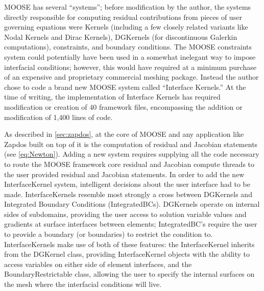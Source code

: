 MOOSE has several ``systems''; before modification by the author, the systems directly responsible for computing residual contributions from pieces of user governing equations were Kernels (including a few closely related variants like Nodal Kernels and Dirac Kernels), DGKernels (for discontinuous Galerkin computations), constraints, and boundary conditions. The MOOSE constraints system could potentially have been used in a somewhat inelegant way to impose interfacial conditions; however, this would have required at a minimum purchase of an expensive and proprietary commercial meshing package. Instead the author chose to code a brand new MOOSE system called ``Interface Kernels.'' At the time of writing, the implementation of Interface Kernels has required modification or creation of 40 framework files, encompassing the addition or modification of 1,400 lines of code.

As described in \cref{sec:zapdos}, at the core of MOOSE and any application like Zapdos built on top of it is the computation of residual and Jacobian statements (see \cref{eq:Newton}). Adding a new system requires supplying all the code necessary to route the MOOSE framework core residual and Jacobian compute threads to the user provided residual and Jacobian statements. In order to add the new InterfaceKernel system, intelligent decisions about the user interface had to be made. InterfaceKernels resemble most strongly a cross between DGKernels and Integrated Boundary Conditions (IntegratedBCs). DGKernels operate on internal sides of subdomains, providing the user access to solution variable values and gradients at surface interfaces between elements; IntegratedBC's require the user to provide a boundary (or boundaries) to restrict the condition to. InterfaceKernels make use of both of these features: the InterfaceKernel inherits from the DGKernel class, providing InterfaceKernel objects with the ability to access variables on either side of element interfaces, and the BoundaryRestrictable class, allowing the user to specify the internal surfaces on the mesh where the interfacial conditions will live.

